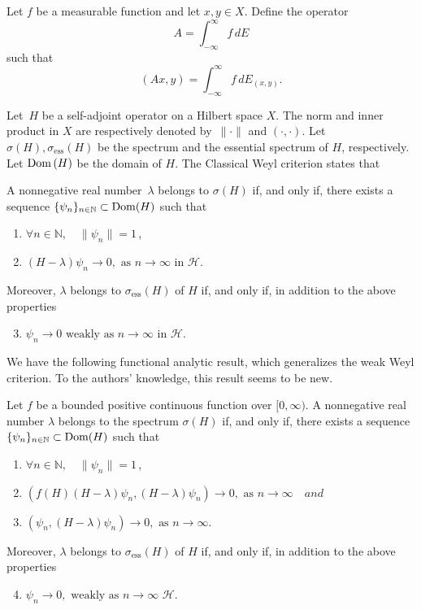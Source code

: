 Let $f$ be a measurable function and let $x,y\in X$. Define the operator
\[
A=\int_{-\infty}^\infty f\,dE
\]
such that
\[
(Ax,y)=\int_{-\infty}^\infty f \,dE_{(x,y)}.
\]

Let~$H$ be a self-adjoint operator on a Hilbert space $X$.
The norm and inner product in $X$ are respectively
denoted by~$\|\cdot\|$ and $(\cdot,\cdot)$. Let $\sigma(H), \sigma_\mathrm{ess}(H)$ be the spectrum and the essential spectrum of $H$, respectively. Let ${\rm Dom}\,(H)$ be the domain of $H$.
The Classical Weyl criterion states that
\begin{theorem}\label{Thm.Weyl}
A nonnegative real number~$\lambda$ belongs to $\sigma(H)$ if, and only if,
there exists a sequence $\{\psi_n\}_{n \in \mathbb N} \subset {\rm Dom}(H)$
such that
%
\begin{enumerate}
\item
$
  \forall n\in\mathbb N, \quad
  \|\psi_n\|=1
$\,,
\item
$
  (H-\lambda)\psi_n \to 0, \text{ as } n\to\infty  \text{ in }\mathcal H.$
\end{enumerate}
%
Moreover, $\lambda$ belongs to $\sigma_\mathrm{ess}(H)$ of $H$ if, and only if,
in addition to the above properties
%
\begin{enumerate}
\setcounter{enumi}{2}
\item
$
  \psi_n \to  0 \text{ weakly as  } n\to\infty \text{ in }\mathcal H.
$
\end{enumerate}
%
\end{theorem}
%



We have the following  functional analytic result, which generalizes the weak Weyl criterion. To the authors' knowledge, this result seems to be new.


\begin{theorem}[Charalambous-Lu]\label{Thm.Weyl.bis-2}
Let $f$ be a  bounded positive continuous function over $[0,\infty)$.
A nonnegative real number  $\lambda$ belongs to the spectrum $\sigma(H)$ if, and only if,
there exists a sequence $\{\psi_n\}_{n \in \mathbb N} \subset {\rm Dom}(H)$
such that
%
\begin{enumerate}
\item
$
  \forall n\in\mathbb N, \quad
  \|\psi_n\|=1
$\,,
\item
$
 (f(H) (H-\lambda)\psi_n, (H-\lambda)\psi_n)\to 0, \text{ as } n\to\infty \quad {and}
$
\item
$
(\psi_n, (H-\lambda)\psi_n) \to  0, \text{ as } n\to\infty.
$

\end{enumerate}
%
Moreover, $\lambda$ belongs to $\sigma_\mathrm{ess}(H)$ of $H$ if, and only if,
in addition to the above properties
%
\begin{enumerate}
\setcounter{enumi}{3}
\item
$
  \psi_n \to 0, \text{ weakly as } n\to\infty
$
 $\mathcal H$.
\end{enumerate}%
%
\end{theorem}


